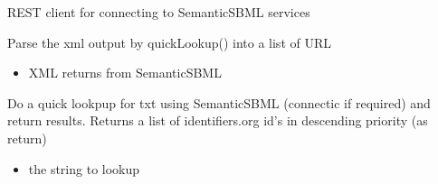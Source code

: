 \documentclass[letterpaper,10pt,english]{sphinxmanual}
\begin{document}

\begin{fulllineitems}
\label{\detokenize{modules_doc:cbmpy.CBNetDB.SemanticSBML}}
\pysigstartsignatures
{}
\pysigstopsignatures
\sphinxAtStartPar
REST client for connecting to SemanticSBML services

\begin{fulllineitems}
\label{\detokenize{modules_doc:cbmpy.CBNetDB.SemanticSBML.parseXMLtoText}}
\pysigstartsignatures
{}
\pysigstopsignatures
\sphinxAtStartPar
Parse the xml output by quickLookup() into a list of URL
\begin{itemize}
\item {} 
\sphinxAtStartPar
{} XML returns from SemanticSBML

\end{itemize}

\end{fulllineitems}


\begin{fulllineitems}
\label{\detokenize{modules_doc:cbmpy.CBNetDB.SemanticSBML.quickLookup}}
\pysigstartsignatures
{}
\pysigstopsignatures
\sphinxAtStartPar
Do a quick lookpup for txt using SemanticSBML (connectic if required) and return results. Returns
a list of identifiers.org id’s in descending priority (as return)
\begin{itemize}
\item {} 
\sphinxAtStartPar
{} the string to lookup

\end{itemize}

\end{fulllineitems}



\end{fulllineitems}
\end{document}
